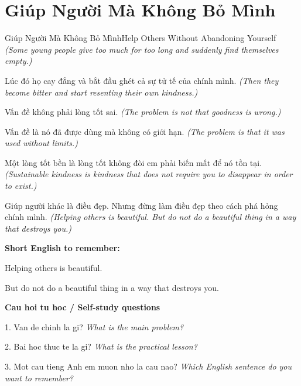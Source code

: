 \section{Giúp Người Mà Không Bỏ Mình}
\begin{truyen}{Giúp Người Mà Không Bỏ Mình}{Help Others Without Abandoning Yourself}
\textit{(Some young people give too much for too long and suddenly find themselves empty.)}

Lúc đó họ cay đắng và bắt đầu ghét cả sự tử tế của chính mình.
\textit{(Then they become bitter and start resenting their own kindness.)}

Vấn đề không phải lòng tốt sai.
\textit{(The problem is not that goodness is wrong.)}

Vấn đề là nó đã được dùng mà không có giới hạn.
\textit{(The problem is that it was used without limits.)}

Một lòng tốt bền là lòng tốt không đòi em phải biến mất để nó tồn tại.
\textit{(Sustainable kindness is kindness that does not require you to disappear in order to exist.)}

\end{truyen}

\begin{baihoc}
Giúp người khác là điều đẹp. Nhưng đừng làm điều đẹp theo cách phá hỏng chính mình.
\textit{(Helping others is beautiful. But do not do a beautiful thing in a way that destroys you.)}
\end{baihoc}

\begin{ghinhoanh}
\textbf{Short English to remember:}

Helping others is beautiful.

But do not do a beautiful thing in a way that destroys you.

\end{ghinhoanh}

\begin{tuhocnhanh}
\textbf{Cau hoi tu hoc / Self-study questions}

1. Van de chinh la gi? \textit{What is the main problem?}

2. Bai hoc thuc te la gi? \textit{What is the practical lesson?}

3. Mot cau tieng Anh em muon nho la cau nao? \textit{Which English sentence do you want to remember?}
\end{tuhocnhanh}
\ngancach

